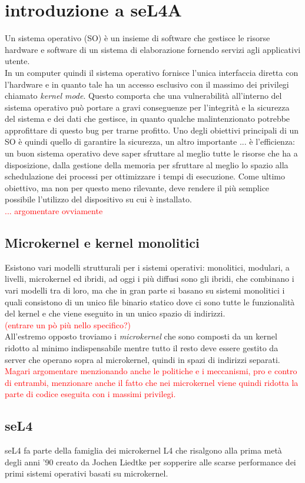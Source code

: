 \chapter{introduzione a seL4A}
Un sistema operativo (SO) è un insieme di software che gestisce le risorse hardware e software di un sistema di elaborazione fornendo servizi agli applicativi utente.\\
In un computer quindi il sistema operativo fornisce l'unica interfaccia diretta con l'hardware e in quanto tale ha un accesso esclusivo con il massimo dei privilegi chiamato \textit{kernel mode}. Questo comporta che una vulnerabilità all'interno del sistema operativo può portare a gravi conseguenze per l'integrità e la sicurezza del sistema e dei dati che gestisce, in quanto qualche malintenzionato potrebbe approfittare di questo bug per trarne profitto.
Uno degli obiettivi principali di un SO è quindi quello di garantire la sicurezza, un altro importante ... è l'efficienza: un buon sistema operativo deve saper sfruttare al meglio tutte le risorse che ha a disposizione, dalla gestione della memoria per sfruttare al meglio lo spazio alla schedulazione dei processi per ottimizzare i tempi di esecuzione. Come ultimo obiettivo, ma non per questo meno rilevante, deve rendere il più semplice possibile l'utilizzo del dispositivo su cui è installato.\\
\textcolor{red}{... argomentare ovviamente}

\section{Microkernel e kernel monolitici}
Esistono vari modelli strutturali per i sistemi operativi: monolitici, modulari, a livelli, microkernel ed ibridi, ad oggi i più diffusi sono gli ibridi, che combinano i vari modelli tra di loro, ma che in gran parte si basano su sistemi monolitici i quali consistono di un unico file binario statico dove ci sono tutte le funzionalità del kernel e che viene eseguito in un unico spazio di indirizzi.\\
\textcolor{red}{(entrare un pò più nello specifico?)}\\
All'estremo opposto troviamo i \textit{microkernel} che sono composti da un kernel ridotto al minimo indispensabile mentre tutto il resto deve essere gestito da server che operano sopra al microkernel, quindi in spazi di indirizzi separati.\\
\textcolor{red}{Magari argomentare menzionando anche le politiche e i meccanismi, pro e contro di entrambi, menzionare anche il fatto che nei microkernel viene quindi ridotta la parte di codice eseguita con i massimi privilegi.}\\

\section{seL4}
seL4 fa parte della famiglia dei microkernel L4 che risalgono alla prima metà degli anni '90 creato da Jochen Liedtke per sopperire alle scarse performance dei primi sistemi operativi basati su microkernel.